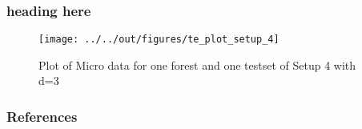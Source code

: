 \documentclass[11pt]{beamer}
\begin{document}
\begin{frame}
    \frametitle{heading here}
    
    \begin{figure}
        \caption{Plot of Micro data for one forest and one testset of Setup 4 with d=3}
    
        \texttt{[image: ../../out/figures/te\_plot\_setup\_4]}

    \end{figure}

\end{frame}


 {
    \begin{frame}
        \frametitle{}
    \end{frame}

}

\begin{frame}[allowframebreaks]
    \frametitle{References}
    
    
    
    
\end{frame}
\end{document}
